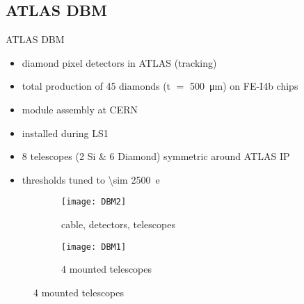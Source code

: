 \subsection{ATLAS DBM}
\begin{frame}{ATLAS DBM}

	\vspace*{-5pt}
	\begin{itemize}
		\itemfill
		\item diamond pixel detectors in ATLAS (tracking)
		\item total production of 45 diamonds (t $=$ \SI{500}{\micro\meter}) on FE-I4b chips
		\item module assembly at CERN
		\item installed during LS1
		\item 8 telescopes (2 Si \& 6 Diamond) symmetric around ATLAS IP
		\item thresholds tuned to \SI{\sim 2500}{e}
	\end{itemize}
	\vspace*{-5pt}

	\begin{figure}[h] 
		\centering
		\begin{subfigure}{0.45\textwidth}  
			\centering
			\texttt{[image: DBM2]}
			\caption{cable, detectors, telescopes}
		\end{subfigure}
		\begin{subfigure}{0.45\textwidth} 
			\centering
			\texttt{[image: DBM1]}
			\caption{4 mounted telescopes } 	
		\end{subfigure} 
	\end{figure}\vspace*{-15pt}

\end{frame}
% 
% 

